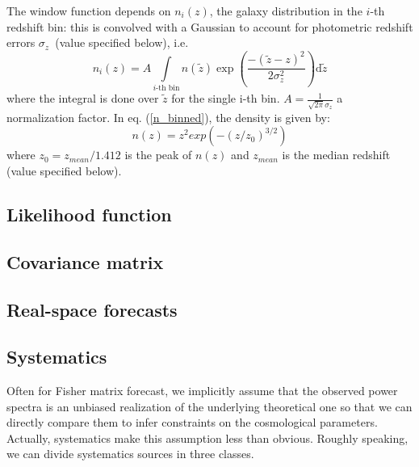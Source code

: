 The window function depends on $n_{i}(z)$, the galaxy distribution
in the $i$-th redshift bin: this is convolved with a Gaussian to account for photometric
redshift errors $\sigma_{z}$~(value specified below), i.e.~
\begin{equation}
n_{i}(z)=A \int\limits _{i\text{-th bin}}n({\tilde z})\exp\left(\frac{-(\tilde{z}-z)^{2}}{2 \sigma_{z}^{2}}\right)\mathrm{d}\tilde{z}
\label{n_binned}
\end{equation}
 where the integral is done over $\tilde{z}$ for the single i-th bin. 
$A = \frac{1}{\sqrt{2\pi} \sigma_z}$ a normalization factor.
In eq. (\ref{n_binned}), the density is given by: 
\begin{equation}
n(z) = z^2 exp(-(z/z_0)^{3/2})
\end{equation}
where $z_0 = z_{mean}/1.412$ is the peak of $n(z)$ and $z_{mean}$ is the median redshift (value specified below).

\subsection{Likelihood function}


\subsection{Covariance matrix}


\subsection{Real-space forecasts}


\subsection{Systematics}

Often for Fisher matrix forecast, we implicitly assume that the observed power spectra
is an unbiased realization of the underlying theoretical one so that we can
directly compare them to infer constraints on the cosmological parameters.
Actually, systematics make this assumption less than obvious. Roughly speaking,
we can divide systematics sources in three classes.


